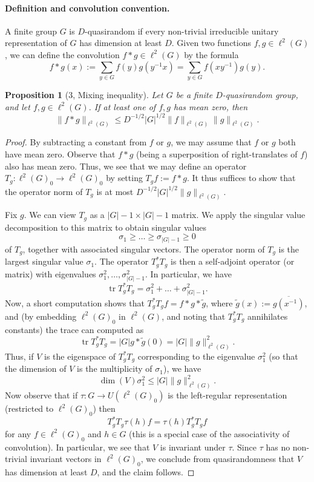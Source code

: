 \documentclass[UTF8,11pt]{ctexart}
\newtheorem*{proposition}{Proposition}
\theoremstyle{definition}
\begin{document}
\paragraph{Definition and convolution convention.}
A finite group $G$ is $D$-quasirandom if every non-trivial irreducible unitary representation of $G$ has dimension at least $D$. Given two functions $f,g\in\ell^2(G)$, we can define the convolution $f*g\in\ell^2(G)$ by the formula
\[f*g(x):=\sum_{y\in G}f(y)g(y^{-1}x)=\sum_{y\in G}f(xy^{-1})g(y).\]
\begin{proposition}[3, Mixing inequality]
Let $G$ be a finite $D$-quasirandom group, and let $f,g\in\ell^2(G)$. If at least one of $f,g$ has mean zero, then
\[\|f*g\|_{\ell^2(G)}\le D^{-1/2}|G|^{1/2}\|f\|_{\ell^2(G)}\|g\|_{\ell^2(G)}.\]
\end{proposition}
\begin{proof}
By subtracting a constant from $f$ or $g$, we may assume that $f$ or $g$ both have mean zero. Observe that $f*g$ (being a superposition of right-translates of $f$) also has mean zero. Thus, we see that we may define an operator $T_g:\ell^2(G)_0\to\ell^2(G)_0$ by setting $T_gf:=f*g$. It thus suffices to show that the operator norm of $T_g$ is at most $D^{-1/2}|G|^{1/2}\|g\|_{\ell^2(G)}$.

Fix $g$. We can view $T_g$ as a $|G|-1\times|G|-1$ matrix. We apply the singular value decomposition to this matrix to obtain singular values
\[\sigma_1\ge\ldots\ge\sigma_{|G|-1}\ge0\]
of $T_g$, together with associated singular vectors. The operator norm of $T_g$ is the largest singular value $\sigma_1$. The operator $T_g^*T_g$ is then a self-adjoint operator (or matrix) with eigenvalues $\sigma_1^2,\ldots,\sigma_{|G|-1}^2$. In particular, we have
\[\operatorname{tr}T_g^*T_g=\sigma_1^2+\ldots+\sigma_{|G|-1}^2.\]
Now, a short computation shows that $T_g^*T_gf=f*g*\tilde g$, where $\tilde g(x):=\overline{g(x^{-1})}$, and (by embedding $\ell^2(G)_0$ in $\ell^2(G)$, and noting that $T_g^*T_g$ annihilates constants) the trace can computed as
\[\operatorname{tr}T_g^*T_g=|G|g*\tilde g(0)=|G|\|g\|_{\ell^2(G)}^2.\]
Thus, if $V$ is the eigenspace of $T_g^*T_g$ corresponding to the eigenvalue $\sigma_1^2$ (so that the dimension of $V$ is the multiplicity of $\sigma_1$), we have
\[\dim(V)\sigma_1^2\le|G|\|g\|_{\ell^2(G)}^2.\]
Now observe that if $\tau:G\to U(\ell^2(G)_0)$ is the left-regular representation (restricted to $\ell^2(G)_0$) then
\[T_g^*T_g\tau(h)f=\tau(h)T_g^*T_gf\]
for any $f\in\ell^2(G)_0$ and $h\in G$ (this is a special case of the associativity of convolution). In particular, we see that $V$ is invariant under $\tau$. Since $\tau$ has no non-trivial invariant vectors in $\ell^2(G)_0$, we conclude from quasirandomness that $V$ has dimension at least $D$, and the claim follows.
\end{proof}
\end{document}
